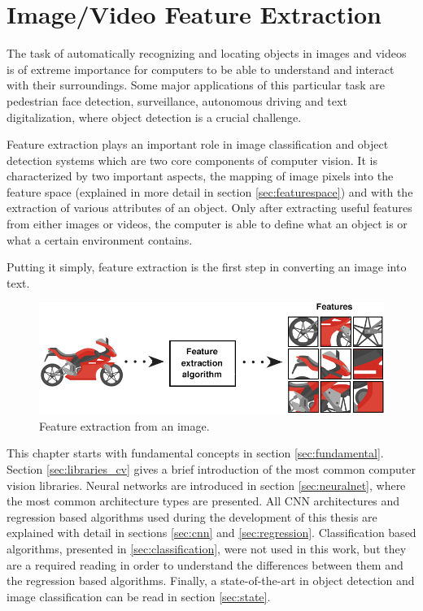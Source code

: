 \cleardoublepage


\chapter{Image/Video Feature Extraction }
\label{ch:computervision}

\par The task of automatically recognizing and locating objects in images and videos is of extreme importance for computers to be able to understand and interact with their surroundings. Some major applications of this particular task are pedestrian face detection, surveillance, autonomous driving and text digitalization, where object detection is a crucial challenge. \cite{Agarwal2019}


\par Feature extraction plays an important role in image classification and object detection systems which are two core components of computer vision. It is characterized by two important aspects, the mapping of image pixels into the feature space (explained in more detail in section \ref{sec:featurespace}) and with the extraction of various attributes of an object. Only after extracting useful features from either images or videos, the computer is able to define what an object is or what a certain environment contains.\cite{Tiwari2013}

Putting it simply, feature extraction is the first step in converting an image into text.

\begin{figure}[htb]
    \centering
    \includegraphics[scale = 0.55]{Sections/2StateOfTheArt/2_images/Feature_extraction.png}
    \caption{Feature extraction from an image. \cite{feature} }  
\end{figure}


\par This chapter starts with fundamental concepts in section \ref{sec:fundamental}. Section \ref{sec:libraries_cv} gives a brief introduction of the most common computer vision libraries. Neural networks are introduced in section \ref{sec:neuralnet}, where the most common architecture types are presented. All CNN architectures and regression based algorithms used during the development of this thesis are explained with detail in sections \ref{sec:cnn} and \ref{sec:regression}. Classification based algorithms, presented in \ref{sec:classification}, were not used in this work, but they are a required reading in order to understand the differences between them and the regression based algorithms. Finally, a state-of-the-art in object detection and image classification can be read in section \ref{sec:state}.

